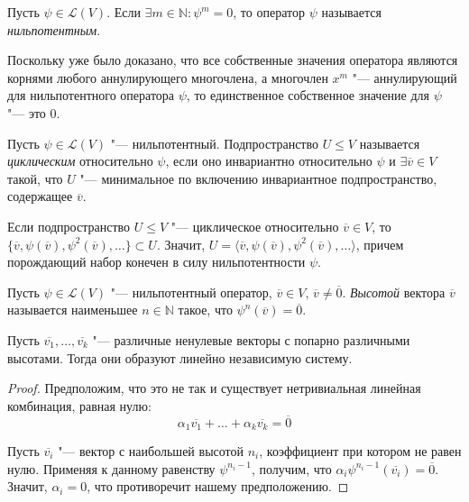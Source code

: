 \begin{definition}
	Пусть $\psi \in \mathcal{L}(V)$. Если $\exists m \in \mathbb{N}: \psi^m = 0$, то оператор $\psi$ называется \textit{нильпотентным}.
\end{definition}

\begin{note}
	Поскольку уже было доказано, что все собственные значения оператора являются корнями любого аннулирующего многочлена, а многочлен $x^m$ "--- аннулирующий для нильпотентного оператора $\psi$, то единственное собственное значение для $\psi$ "--- это 0.
\end{note}

\begin{definition}
	Пусть $\psi \in \mathcal{L}(V)$ "--- нильпотентный. Подпространство $U \le V$ называется \textit{циклическим} относительно $\psi$, если оно инвариантно относительно $\psi$ и $\exists \overline{v} \in V$ такой, что $U$ "--- минимальное по включению инвариантное подпространство, содержащее $\overline{v}$.
\end{definition}

\begin{note}
	Если подпространство $U \le V$ "--- циклическое относительно $\overline{v} \in V$, то $\{\overline{v}, \psi(\overline{v}), \psi^2(\overline{v}), \dots\} \subset U$. Значит, $U = \langle\overline{v}, \psi(\overline{v}), \psi^2(\overline{v}), \dots\rangle$, причем порождающий набор конечен в силу нильпотентности $\psi$.
\end{note}

\begin{definition}
	Пусть $\psi \in \mathcal{L}(V)$ "--- нильпотентный оператор, $\overline{v} \in V$, $\overline{v} \ne \overline{0}$. \textit{Высотой} вектора $\overline{v}$ называется наименьшее $n \in \mathbb{N}$ такое, что $\psi^n(\overline{v}) = \overline{0}$.
\end{definition}

\begin{proposition}
	Пусть $\overline{v_1}, \dots, \overline{v_k}$ "--- различные ненулевые векторы с попарно различными высотами. Тогда они образуют линейно независимую систему.
\end{proposition}

\begin{proof}
	Предположим, что это не так и существует нетривиальная линейная комбинация, равная нулю:
	\[\alpha_1\overline{v_1} + \dots + \alpha_k\overline{v_k} = \overline{0}\]
	
	Пусть $\overline{v_i}$ "--- вектор с наибольшей высотой $n_i$, коэффициент при котором не равен нулю. Применяя к данному равенству $\psi^{n_i - 1}$, получим, что $\alpha_i\psi^{n_i-1}(\overline{v_i}) = \overline{0}$. Значит, $\alpha_i = 0$, что противоречит нашему предположению.
\end{proof}

